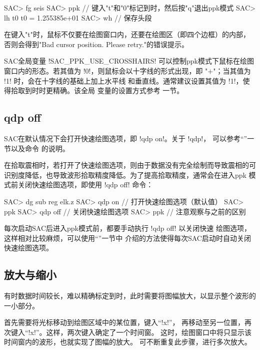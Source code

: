 \begin{SACCode}
SAC> fg seis
SAC> ppk
// 键入"t"和"0"标记到时，然后按"q"退出ppk模式
SAC> lh t0
     t0 = 1.255385e+01
SAC> wh         // 保存头段
\end{SACCode}

\begin{note}
在键入"t"时，鼠标不仅要在绘图窗口内，还要在绘图区（即四个边框）的内部，
否则会得到"Bad cursor position. Please retry."的错误提示。
\end{note}

\begin{note}
SAC全局变量 !SAC_PPK_USE_CROSSHAIRS! 可以控制ppk模式下鼠标在绘图
窗口内的形态。若其值为 !0!，则鼠标会以十字线的形式出现，即
"{\Large$+$}"；当其值为 !1! 时，会在十字线的基础上加上水平线
和垂直线。通常建议设置其值为 !1!，使得拾取到时时更精确。该全局
变量的设置方式参考  一节。
\end{note}

\subsection{qdp off}
SAC在默认情况下会打开快速绘图选项，即 !qdp on!。关于 !qdp!，
可以参考``''一节以及命令 
的说明。

在拾取震相时，若打开了快速绘图选项，则由于数据没有完全绘制而导致震相的可
识别度降低，也导致波形拾取精度降低。为了提高拾取精度，通常会在进入ppk
模式前关闭快速绘图选项，即使用 !qdp off! 命令：
\begin{SACCode}
SAC> dg sub reg elk.z
SAC> qdp on     // 打开快速绘图选项（默认值）
SAC> ppk
SAC> qdp off    // 关闭快速绘图选项
SAC> ppk        // 注意观察与之前的区别
\end{SACCode}
每次启动SAC后进入ppk模式前，都要手动执行 !qdp off! 以关闭快速
绘图选项，这样相对比较麻烦，可以使用``''一节中
介绍的方法使得每次SAC启动时自动关闭快速绘图选项。

\subsection{放大与缩小}
有时数据时间较长，难以精确标定到时，此时需要将图幅放大，以显示整个波形的
一小部分。

首先需要将光标移动到绘图区域中的某位置，键入``!x!''，
再移动至另一位置，再次键入``!x!''。这样，两次键入确定了一个时间窗。
这时，绘图窗口中将只显示该时间窗内的波形，也就实现了图幅的放大。
可不断重复此步骤，进行多次放大。

